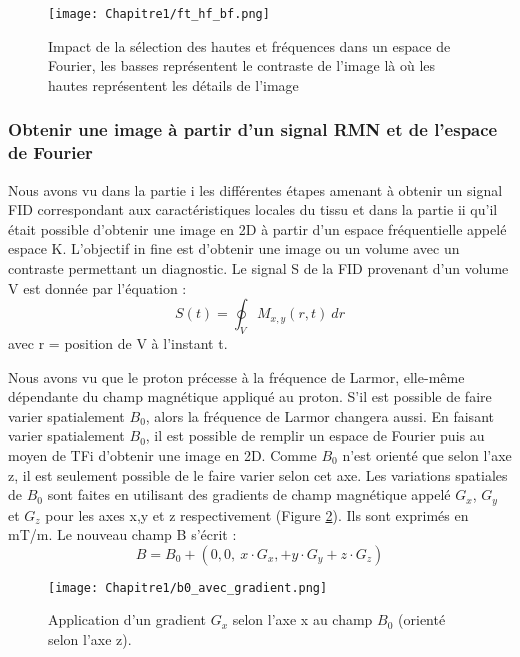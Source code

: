 \begin{figure}[!htbp]
  \begin{center}
    \texttt{[image: Chapitre1/ft\_hf\_bf.png]}
     \end{center}
    \caption{Impact de la sélection des hautes et fréquences dans un espace de Fourier, les basses représentent le contraste de l’image là où les hautes représentent les détails de l’image}
  \label{fig:ft_HF_BF}
\end{figure}

	\subsubsection{Obtenir une image à partir d’un signal RMN et de l’espace de Fourier}

Nous avons vu dans la partie i les différentes étapes amenant à obtenir un signal FID correspondant aux caractéristiques locales du tissu et dans la partie ii qu’il était possible d’obtenir une image en 2D à partir d’un espace fréquentielle appelé espace K. L’objectif in fine est d’obtenir une image ou un volume avec un contraste permettant un diagnostic.
Le signal S de la FID provenant d’un volume V est donnée par l’équation :
\begin{equation}
\nonumber
S\left(t\right)=\oint_{V}{M_{x,y}\left(r,t\right)\ dr}
\end{equation}
avec r = position de V à l’instant t.

Nous avons vu que le proton précesse à la fréquence de Larmor, elle-même dépendante du champ magnétique appliqué au proton. S’il est possible de faire varier spatialement $B_0$, alors la fréquence de Larmor changera aussi. En faisant varier spatialement $B_0$, il est possible de remplir un espace de Fourier puis au moyen de TFi d’obtenir une image en 2D. Comme $B_0$ n’est orienté que selon l’axe z, il est seulement possible de le faire varier selon cet axe. Les variations spatiales de $B_0$ sont faites en utilisant des gradients de champ magnétique appelé $G_x$, $G_y$ et $G_z$ pour les axes x,y et z respectivement (Figure \ref{fig:b_gx}). Ils sont exprimés en mT/m. Le nouveau champ B s’écrit :
\begin{equation}
\nonumber
B=B_0+(0,0,\ x \cdot G_x,+y \cdot G_y+z \cdot G_z)
\end{equation}

\begin{figure}[!htbp]
  \begin{center}
    \texttt{[image: Chapitre1/b0\_avec\_gradient.png]}
     \end{center}
    \caption{Application d'un gradient $G_x$ selon l'axe x au champ $B_0$ (orienté selon l'axe z).}
  \label{fig:b_gx}
\end{figure}

